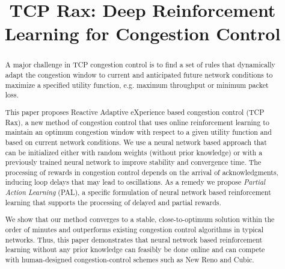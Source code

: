 \documentclass[newfonts=false,format=sigconf,10pt,letterpaper]{acmart}
\begin{document}
\title{TCP Rax: Deep Reinforcement Learning for Congestion Control}

%
%


\renewcommand{\shortauthors}{X. et al.}

\begin{abstract}

A major challenge in TCP congestion control is to find a set of rules that dynamically adapt the congestion window to current and anticipated future network conditions to maximize a specified utility function, e.g. maximum throughput or minimum packet loss. 

This paper proposes Reactive Adaptive eXperience based congestion control (TCP Rax), a new method of congestion control that uses online reinforcement learning to maintain an optimum congestion window with respect to a given utility function and based on current network conditions. We use a neural network based approach that can be initialized either with random weights (without prior knowledge) or with a previously trained neural network to improve stability and convergence time. The processing of rewards in congestion control depends on the arrival of acknowledgments, inducing loop delays that may lead to oscillations. As a remedy we propose \textit{Partial Action Learning} (PAL), a specific formulation of neural network based reinforcement learning that supports the processing of delayed and partial rewards. 

We show that our method converges to a stable, close-to-optimum solution within the order of minutes and outperforms existing congestion control algorithms in typical networks. Thus, this paper demonstrates that neural network based reinforcement learning without any prior knowledge can feasibly be done online and can compete with human-designed congestion-control schemes such as New Reno and Cubic.

\end{abstract}
\end{document}
